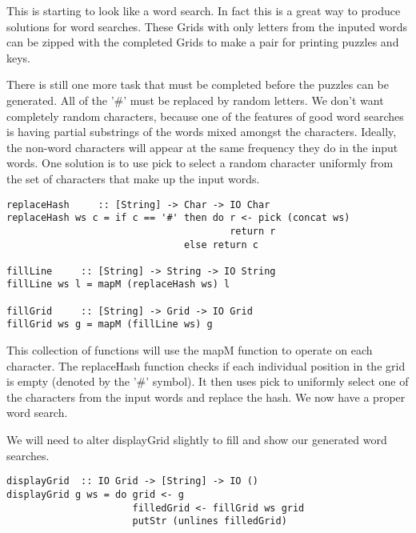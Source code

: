 \documentclass[12pt]{report}   %
\begin{document}
    This is starting to look like a word search. In fact this is a great way
    to produce solutions for word searches. These Grids with only letters from
    the inputed words can be zipped with the completed Grids to make a pair
    for printing puzzles and keys.

    \vspace{12pt}

    There is still one more task that must be completed before the puzzles can
    be generated. All of the '\#' must be replaced by random letters. We don't
    want completely random characters, because one of the features of good word
    searches is having partial substrings of the words mixed amongst the
    characters. Ideally, the non-word characters will appear at the same
    frequency they do in the input words. One solution is to use pick to select
    a random character uniformly from the set of characters that make up the
    input words.

    \vspace{12pt}

    \begin{lstlisting}
replaceHash     :: [String] -> Char -> IO Char
replaceHash ws c = if c == '#' then do r <- pick (concat ws)
                                       return r
                               else return c

fillLine     :: [String] -> String -> IO String
fillLine ws l = mapM (replaceHash ws) l

fillGrid     :: [String] -> Grid -> IO Grid
fillGrid ws g = mapM (fillLine ws) g
    \end{lstlisting}

    \vspace{12pt}

    This collection of functions will use the mapM function to operate on each
    character. The replaceHash function checks if each individual position in
    the grid is empty (denoted by the '\#' symbol). It then uses pick to 
    uniformly select one of the characters from the input words and replace
    the hash. We now have a proper word search.

    \vspace{12pt}

    We will need to alter displayGrid slightly to fill and show our generated
    word searches.

    \vspace {12pt}

    \begin{lstlisting}
displayGrid  :: IO Grid -> [String] -> IO ()
displayGrid g ws = do grid <- g
                      filledGrid <- fillGrid ws grid
                      putStr (unlines filledGrid)
    \end{lstlisting}
\end{document}
